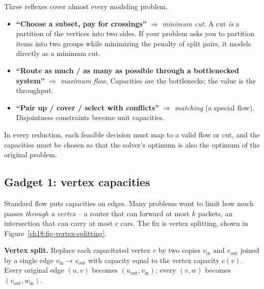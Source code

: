 \begin{intuitionbox}
Three reflexes cover almost every modeling problem.
\begin{itemize}
\item \textbf{``Choose a subset, pay for crossings''} $\Rightarrow$ \emph{minimum cut}. A cut \emph{is} a partition of the vertices into two sides. If your problem asks you to partition items into two groups while minimizing the penalty of split pairs, it models directly as a minimum cut.
\item \textbf{``Route as much / as many as possible through a bottlenecked system''} $\Rightarrow$ \emph{maximum flow}. Capacities are the bottlenecks; the value is the throughput.
\item \textbf{``Pair up / cover / select with conflicts''} $\Rightarrow$ \emph{matching} (a special flow). Disjointness constraints become unit capacities.
\end{itemize}
In every reduction, each feasible decision must map to a valid flow or cut, and the capacities must be chosen so that the solver's optimum is also the optimum of the original problem.
\end{intuitionbox}

\subsection{Gadget 1: vertex capacities}
\label{ch18:vertex-cap}

Standard flow puts capacities on edges. Many problems want to limit how much passes \emph{through a vertex} -- a router that can forward at most $k$ packets, an intersection that can carry at most $c$ cars. The fix is vertex splitting, shown in Figure~\ref{ch18:fig-vertex-splitting}.

\begin{focusbox}
\textbf{Vertex split.} Replace each capacitated vertex $v$ by two copies $v_{\text{in}}$ and $v_{\text{out}}$ joined by a single edge $v_{\text{in}}\to v_{\text{out}}$ with capacity equal to the vertex capacity $c(v)$. Every original edge $(u,v)$ becomes $(u_{\text{out}}, v_{\text{in}})$; every $(v,w)$ becomes $(v_{\text{out}}, w_{\text{in}})$.
\end{focusbox}

